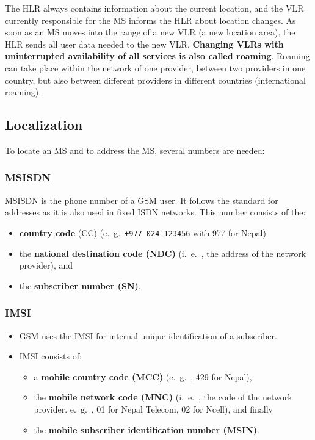 The HLR always contains information about the current location, and the VLR currently responsible for the MS informs the HLR about location changes. As soon as an MS moves into the range of a new VLR (a new location area), the HLR sends all user data needed to the new VLR. \textbf{Changing VLRs with uninterrupted availability of all services is also called roaming}. Roaming can take place within the network of one provider, between two providers in one country, but also between different providers in different countries (international roaming).

\subsection{Localization}
To locate an MS and to address the MS, several numbers are needed:

\subsubsection{MSISDN}
MSISDN is the phone number of a GSM user. It follows the standard for addresses as it is also used in fixed ISDN networks. This number
consists of the:
\begin{itemize}
	\item \textbf{country code} (CC) (e.\ g.\, \texttt{+977 024-123456} with 977 for Nepal)
	\item the \textbf{national destination code (NDC)} (i.\ e.\ , the address of the network provider), and 
	\item the \textbf{subscriber number (SN)}.
\end{itemize}

\subsubsection{IMSI}
 \begin{itemize}
 	\item GSM uses the IMSI for internal unique identification of a subscriber.
 	\item IMSI consists of:
 		\begin{itemize}
 			\item a \textbf{mobile country code (MCC)} (e.\ g.\ , 429 for Nepal), 
 			\item the \textbf{mobile network code (MNC)} (i.\ e.\ , the code of the network provider. e.\ g.\ , 01 for Nepal Telecom, 02 for Ncell), and finally
 			\item the \textbf{mobile subscriber identification number (MSIN)}.
 		\end{itemize}
 \end{itemize}  

